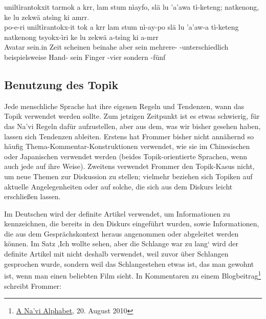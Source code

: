\begin{interlin}
	\glll \Npawl{} uniltìrantokxit tarmok a krr, lam stum nìayfo, slä lu 'a'awa tì-keteng; natkenong,  ke lu zekwä atsìng ki amrr. \\
	po-e-ri uniltìrantokx-it tok a krr lam stum nì-ay-po slä lu 'a'aw-a tì-keteng natkenong tsyokx-ìri ke lu zekwä a-tsìng ki a-mrr \\
	 Avatar sein.in  Zeit scheinen beinahe  aber sein mehrere- -unterschiedlich beispielsweise Hand-  sein Finger -vier sondern -fünf \\
\end{interlin}

\subsection{Benutzung des Topik}
Jede menschliche Sprache hat ihre eigenen Regeln und Tendenzen, wann das Topik verwendet werden sollte. Zum jetzigen Zeitpunkt ist es etwas schwierig, für das Na'vi Regeln dafür aufzustellen, aber aus dem, was wir bisher gesehen haben, lassen sich Tendenzen ableiten. Erstens hat Frommer bisher nicht annähernd so häufig Thema-Kommentar-Konstruktionen verwendet, wie sie im Chinesischen oder Japanischen verwendet werden (beides Topik-orientierte Sprachen, wenn auch jede auf ihre Weise). Zweitens verwendet Frommer den Topik-Kasus nicht, um neue Themen zur Diskussion zu stellen; vielmehr beziehen sich Topiken auf aktuelle Angelegenheiten oder auf solche, die sich aus dem Diskurs leicht erschließen lassen.

Im Deutschen wird der definite Artikel  verwendet, um Informationen zu kennzeichnen, die bereits in den Diskurs eingeführt wurden, sowie Informationen, die aus dem Gesprächskontext heraus angenommen oder abgeleitet werden können. Im Satz ,Ich wollte  sehen, aber die Schlange war zu lang‘ wird der definite Artikel mit  nicht deshalb verwendet, weil zuvor über Schlangen gesprochen wurde, sondern weil das Schlangestehen etwas ist, das man gewohnt ist, wenn man einen beliebten Film sieht. In Kommentaren zu einem Blogbeitrag\footnote{\href{https://naviteri.org/2010/08/20/}{A Na'vi Alphabet}, 20. August 2010} schreibt Frommer: 


